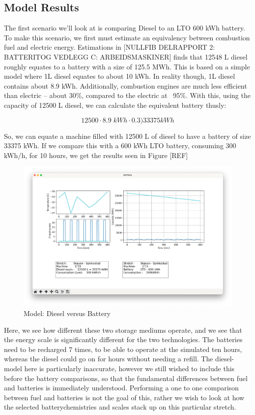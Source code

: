 \documentclass{article}
\begin{document}
\subsection{Model Results}

The first scenario we’ll look at is comparing Diesel to an LTO 600 kWh battery. To make this scenario, we first must estimate an equivalency between combustion fuel and electric energy. Estimations in [NULLFIB DELRAPPORT 2: BATTERITOG VEDLEGG C: ARBEIDSMASKINER] finds that 12548 L diesel roughly equates to a battery with a size of 125.5 MWh. This is based on a simple model where 1L diesel equates to about 10 kWh. In reality though, 1L diesel contains about 8.9 kWh. Additionally, combustion engines are much less efficient than electric -- about 30\%, compared to the electric at ~95\%. With this, using the capacity of 12500 L diesel, we can calculate the equivalent battery thusly:

\begin{equation*}
    12500\cdot8.9\;kWh\cdot0.3)33375 kWh
\end{equation*}

So, we can equate a machine filled with 12500 L of diesel to have a battery of size 33375 kWh. If we compare this with a 600 kWh LTO battery, consuming 300 kWh/h, for 10 hours, we get the results seen in Figure [REF]

\begin{figure}[H]
    \centering
    \includegraphics*[width=1\textwidth]{img/image8.png}
    \caption{Model: Diesel versus Battery}
\end{figure}

Here, we see how different these two storage mediums operate, and we see that the energy scale is significantly different for the two technologies. The batteries need to be recharged 7 times, to be able to operate at the simulated ten hours, whereas the diesel could go on for hours without needing a refill. The diesel-model here is particularly inaccurate, however we still wished to include this before the battery comparisons, so that the fundamental differences between fuel and batteries is immediately understood. Performing a one to one comparison between fuel and batteries is not the goal of this, rather we wish to look at how the selected batterychemistries and scales stack up on this particular stretch.
\end{document}
